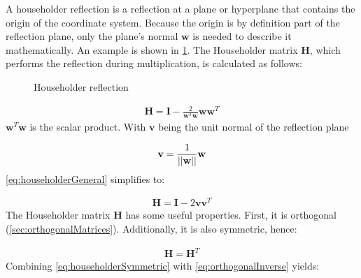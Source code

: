 A householder reflection is a reflection at a plane or hyperplane that contains the origin of the coordinate system.
Because the origin is by definition part of the reflection plane, only the plane's normal $\mathbf{w}$ is needed to describe it mathematically.
An example is shown in \cref{fig:housholderReflection}.
The Householder matrix $\mathbf{H}$, which performs the reflection during multiplication, is calculated as follows:


\begin{figure}
	\centering
	\caption{Householder reflection}
	\label{fig:housholderReflection}
\end{figure}


\begin{align}
\label{eq:householderGeneral}
\mathbf{H} = \mathbf{I} - \frac{2}{\mathbf{w}^T\mathbf{w}}\mathbf{w}\mathbf{w}^T
\end{align}
%
$\mathbf{w}^T\mathbf{w}$ is the scalar product. With $\mathbf{v}$ being the unit normal of the reflection plane

\begin{align}
	\mathbf{v} = \frac{1}{\left\vert\left\vert\mathbf{w}\right\vert\right\vert}\mathbf{w}
\end{align}
%
\cref{eq:householderGeneral} simplifies to:

\begin{align}
\label{eq:householderUnitLength}
\mathbf{H} = \mathbf{I} - 2\mathbf{v}\mathbf{v}^T
\end{align}
%
The Householder matrix $\mathbf{H}$ has some useful properties.
First, it is orthogonal (\cref{sec:orthogonalMatrices}).
Additionally, it is also symmetric, hence:

\begin{align}
\label{eq:householderSymmetric}
\mathbf{H} = \mathbf{H}^T
\end{align}
%
Combining \cref{eq:householderSymmetric} with \cref{eq:orthogonalInverse} yields:

